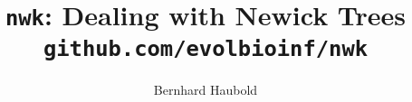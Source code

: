 \documentclass[a4paper]{article}
\begin{document}
\pagestyle{noweb}

\title{\texttt{nwk}: Dealing with Newick Trees\\
\small \texttt{github.com/evolbioinf/nwk}}
\author{Bernhard Haubold}
\maketitle
\tableofcontents





\end{document}
